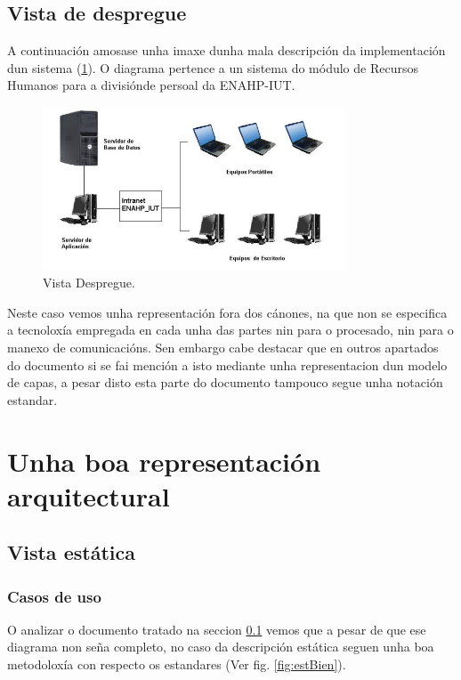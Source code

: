 \documentclass[DIV=calc,paper=a4,fontsize=11pt,onecolumn]{scrartcl}	 %
\begin{document}
\subsection{Vista de despregue}\label{sec:despMal}
A continuación amosase unha imaxe dunha mala descripción da implementación dun sistema (\ref{fig:despMal}). O diagrama pertence a un sistema do módulo de Recursos Humanos para a divisiónde persoal da ENAHP-IUT.\cite{ENAHP}
\begin{figure}[h]
\centering
\includegraphics[width = 0.8\textwidth]{./figuras/despliegueMal.png}
\caption{Vista Despregue.}
\label{fig:despMal}
\end{figure}

Neste caso vemos unha representación fora dos cánones, na que non se especifica a tecnoloxía empregada en cada unha das partes nin para o procesado, nin para o manexo de comunicacións. Sen embargo cabe destacar que en outros apartados do documento si se fai mención a isto mediante unha representacion dun modelo de capas, a pesar disto esta parte do documento tampouco segue unha notación estandar.

\newpage
\section{Unha boa representación arquitectural}
\subsection{Vista estática}
\subsubsection{Casos de uso}
O analizar o documento tratado na seccion \ref{sec:despMal} vemos que a pesar de que ese diagrama non seña completo, no caso da descripción estática seguen unha boa metodoloxía con respecto os estandares (Ver fig. \ref{fig:estBien}).
\end{document}
